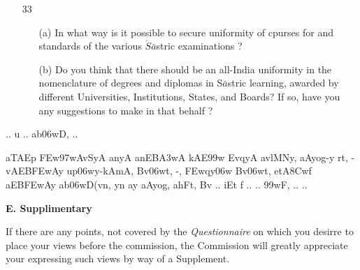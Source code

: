 {\begin{itemize}
\begin{itemize}
           \end{itemize}         
           
 \item[33] \begin{itemize}
             
            \item[(a)] In what way is it possible to secure uniformity of cpurses for and standards of the various $\acute{S}\bar{a}$stric examinations ?
            
            \item[(b)] Do you think that there should be an all-India uniformity in the nomenclature of degrees and diplomas in S$\bar{a}$stric learning, awarded by different Universities, Institutions, States, and Boards? If so, have you any suggestions to make in that behalf ? 
           \end{itemize}           
                      
\end{itemize}
}

\newpage

\thispagestyle{empty}
\begin{center}
{\dn .. u .. ab\306wD, ..}
\end{center}

{\dn aTAEp \3FEw\397wAvSyA anyA anEB\3A3wA kA\2E\399w EvqyA avlMNy{\rs ,\re} aAyog-y rt, -vAEB\3FEwAy up\306wy-kAmA, Bv\306wt, -, \3FEw\?qy\306w Bv\306wt, etA\38Cwf aEB\3FEwAy ab\306wD(v\?n{\rs ,\re} y\?n ay aAyog, ahFt, Bv\? .. iEt f ..\,{\rs *\re}\,.. \399wF, ..\,{\rs *\re}\,..}

\newpage

\thispagestyle{empty}
{\rm 
\begin{center}
{\rm\bfseries E. Supplimentary}
\end{center}

If there are any points, not covered by the {\textit {Questionnaire}} on which you desirre to place your views before the commission, the Commission will greatly appreciate your expressing such views by way of a Supplement.}


